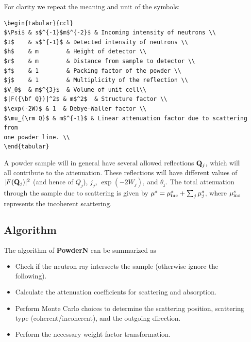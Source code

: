 For clarity we repeat the meaning and unit of the symbols:
%
\begin{lstlisting}\begin{tabular}{ccl}
$\Psi$ & s$^{-1}$m$^{-2}$ & Incoming intensity of neutrons \\
$I$    & s$^{-1}$ & Detected intensity of neutrons \\
$h$    & m        & Height of detector \\
$r$    & m        & Distance from sample to detector \\
$f$    & 1        & Packing factor of the powder \\
$j$    & 1        & Multiplicity of the reflection \\
$V_0$  & m$^{3}$  & Volume of unit cell\\
$|F({\bf Q})|^2$ & m$^2$  & Structure factor \\
$\exp(-2W)$ & 1  & Debye-Waller factor \\
$\mu_{\rm Q}$ & m$^{-1}$ & Linear attenuation factor due to scattering from
one powder line. \\
\end{tabular}\end{lstlisting}
%

A powder sample will in general have several allowed reflections
${\bf Q}_j$, which will all contribute to the attenuation.
These reflections will have different values of
$|F({\bf Q}_j)|^2$ (and hence of $Q_j$), $j_j$, $\exp(-2W_j)$,
and $\theta_j$.
The total attenuation through the sample due to scattering is given by
$\mu^s = \mu_{\rm inc}^s + \sum_j \mu^s_j $,
where $\mu_{\rm inc}^s$ represents the incoherent scattering.

\subsection{Algorithm}
The algorithm of {\bf PowderN} can be summarized as
\begin{itemize}
\item Check if the neutron ray intersects the sample (otherwise ignore
the following).
\item Calculate the attenuation coefficients for scattering and absorption.
\item Perform Monte Carlo choices to determine the scattering position,
scattering type (coherent/incoherent), and the outgoing direction.
\item Perform the necessary weight factor transformation.
\end{itemize}

